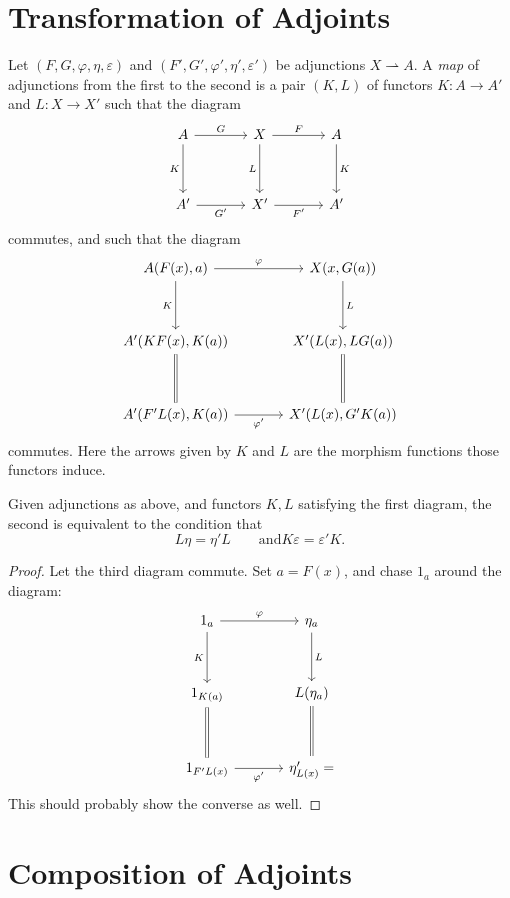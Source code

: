 \section{Transformation of Adjoints}

Let $(F,G,\varphi  ,\eta ,\varepsilon )$ and $(F',G',\varphi ',\eta ',\varepsilon ') $ be adjunctions $X\rightharpoonup A$. A \emph{map} of adjunctions from the first to the second is a pair $(K,L)$ of functors $K : A \to A'$ and $L : X \to X'$ such that the diagram
\[\begin{tikzcd}[row sep = 3.5em, column sep = 3.5em]
A\ar[" G ", r] \ar[" K "', d]  & X\ar[" F ", r] \ar[" L "', d]  & A\ar[" K ", d]  \\
A'\ar[" G' "', r]  & X'\ar[" F' "', r]  & A'
\end{tikzcd}\]
commutes, and such that the diagram
\[\begin{tikzcd}[row sep = 3.5em, column sep = 3.5em]
A(F(x),a)\ar[" \varphi  ", r] \ar[" K "', d]  & X(x,G(a))\ar[" L ", d]  \\
A'(KF(x),K(a))\ar[equals, d]  & X'(L(x),LG(a))\ar[equals, d]  \\
A'(F'L(x),K(a))\ar[" \varphi ' "', r]  & X'(L(x),G'K(a))
\end{tikzcd}\]
commutes. Here the arrows given by $K$ and $L$ are the morphism functions those functors induce.

\begin{proposition}\label{prp:4.5}
	Given adjunctions as above, and functors $K,L$ satisfying the first diagram, the second is equivalent to the condition that
	\[
		L\eta =\eta 'L\qquad \text{and} K\varepsilon =\varepsilon 'K
	.\]
\end{proposition}
\begin{proof}
	Let the third diagram commute. Set $a=F(x)$, and chase $1_a$ around the diagram:
	\[\begin{tikzcd}[row sep = 3.5em, column sep = 3.5em]
	1_a \ar[" \varphi  ", r] \ar[" K "', d]  & \eta_a \ar[" L ", d]  \\
	1_{K(a)} \ar[equals, d]  & \ar[equals, d] L(\eta_a) \\
	1_{F'L(x)} \ar[" \varphi ' "', r]  & \eta_{L(x)}' =
	\end{tikzcd}\]
	This should probably show the converse as well.
\end{proof}

\section{Composition of Adjoints}

